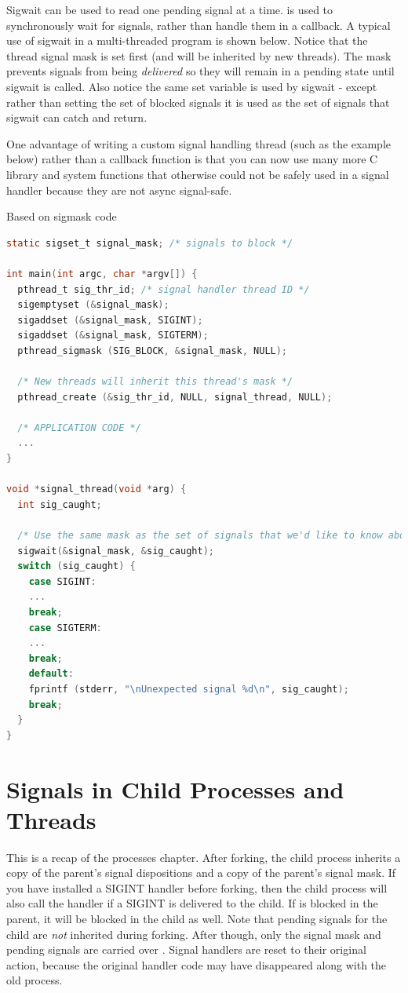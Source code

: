 Sigwait can be used to read one pending signal at a time.
 is used to synchronously wait for signals, rather than handle them in a callback.
A typical use of sigwait in a multi-threaded program is shown below.
Notice that the thread signal mask is set first (and will be inherited by new threads).
The mask prevents signals from being \emph{delivered} so they will remain in a pending state until sigwait is called.
Also notice the same set  variable is used by sigwait - except rather than setting the set of blocked signals it is used as the set of signals that sigwait can catch and return.

One advantage of writing a custom signal handling thread (such as the example below) rather than a callback function is that you can now use many more C library and system functions that otherwise could not be safely used in a signal handler because they are not async signal-safe.

Based on sigmask code \cite{pthread_sigmask}

\begin{lstlisting}[language=C]
static sigset_t signal_mask; /* signals to block */

int main(int argc, char *argv[]) {
  pthread_t sig_thr_id; /* signal handler thread ID */
  sigemptyset (&signal_mask);
  sigaddset (&signal_mask, SIGINT);
  sigaddset (&signal_mask, SIGTERM);
  pthread_sigmask (SIG_BLOCK, &signal_mask, NULL);

  /* New threads will inherit this thread's mask */
  pthread_create (&sig_thr_id, NULL, signal_thread, NULL);

  /* APPLICATION CODE */
  ...
}

void *signal_thread(void *arg) {
  int sig_caught;

  /* Use the same mask as the set of signals that we'd like to know about! */
  sigwait(&signal_mask, &sig_caught);
  switch (sig_caught) {
    case SIGINT:
    ...
    break;
    case SIGTERM:
    ...
    break;
    default:
    fprintf (stderr, "\nUnexpected signal %d\n", sig_caught);
    break;
  }
}
\end{lstlisting}

\section{Signals in Child Processes and Threads}

This is a recap of the processes chapter.
After forking, the child process inherits a copy of the parent's signal dispositions and a copy of the parent's signal mask.
If you have installed a SIGINT handler before forking, then the child process will also call the handler if a SIGINT is delivered to the child.
If  is blocked in the parent, it will be blocked in the child as well.
Note that pending signals for the child are \emph{not} inherited during forking.
After  though, only the signal mask and pending signals are carried over \cite{execute}.
Signal handlers are reset to their original action, because the original handler code may have disappeared along with the old process.

